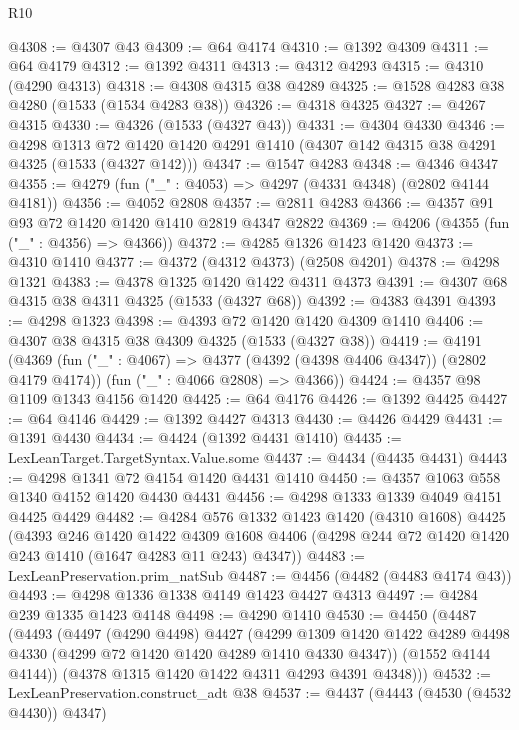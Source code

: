 \begin{lexlean}{R10}
\begin{coremodule}
@4308 := @4307 @43
@4309 := @64 @4174
@4310 := @1392 @4309
@4311 := @64 @4179
@4312 := @1392 @4311
@4313 := @4312 @4293
@4315 := @4310 (@4290 @4313)
@4318 := @4308 @4315 @38 @4289
@4325 := @1528 @4283 @38 @4280 (@1533 (@1534 @4283 @38))
@4326 := @4318 @4325
@4327 := @4267 @4315
@4330 := @4326 (@1533 (@4327 @43))
@4331 := @4304 @4330
@4346 := @4298
    @1313
    @72
    @1420
    @1420
    @4291
    @1410
    (@4307 @142 @4315 @38 @4291 @4325 (@1533 (@4327 @142)))
@4347 := @1547 @4283
@4348 := @4346 @4347
@4355 := @4279 (fun ("_" : @4053) => @4297 (@4331 @4348) (@2802 @4144 @4181))
@4356 := @4052 @2808
@4357 := @2811 @4283
@4366 := @4357 @91 @93 @72 @1420 @1420 @1410 @2819 @4347 @2822
@4369 := @4206 (@4355 (fun ("_" : @4356) => @4366))
@4372 := @4285 @1326 @1423 @1420
@4373 := @4310 @1410
@4377 := @4372 (@4312 @4373) (@2508 @4201)
@4378 := @4298 @1321
@4383 := @4378 @1325 @1420 @1422 @4311 @4373
@4391 := @4307 @68 @4315 @38 @4311 @4325 (@1533 (@4327 @68))
@4392 := @4383 @4391
@4393 := @4298 @1323
@4398 := @4393 @72 @1420 @1420 @4309 @1410
@4406 := @4307 @38 @4315 @38 @4309 @4325 (@1533 (@4327 @38))
@4419 := @4191
    (@4369
      (fun ("_" : @4067) => @4377 (@4392 (@4398 @4406 @4347)) (@2802 @4179 @4174))
      (fun ("_" : @4066 @2808) => @4366))
@4424 := @4357 @98 @1109 @1343 @4156 @1420
@4425 := @64 @4176
@4426 := @1392 @4425
@4427 := @64 @4146
@4429 := @1392 @4427 @4313
@4430 := @4426 @4429
@4431 := @1391 @4430
@4434 := @4424 (@1392 @4431 @1410)
@4435 := LexLeanTarget.TargetSyntax.Value.some
@4437 := @4434 (@4435 @4431)
@4443 := @4298 @1341 @72 @4154 @1420 @4431 @1410
@4450 := @4357 @1063 @558 @1340 @4152 @1420 @4430 @4431
@4456 := @4298 @1333 @1339 @4049 @4151 @4425 @4429
@4482 := @4284
    @576
    @1332
    @1423
    @1420
    (@4310 @1608)
    @4425
    (@4393
      @246
      @1420
      @1422
      @4309
      @1608
      @4406
      (@4298 @244 @72 @1420 @1420 @243 @1410 (@1647 @4283 @11 @243) @4347))
@4483 := LexLeanPreservation.prim_natSub
@4487 := @4456 (@4482 (@4483 @4174 @43))
@4493 := @4298 @1336 @1338 @4149 @1423 @4427 @4313
@4497 := @4284 @239 @1335 @1423 @4148
@4498 := @4290 @1410
@4530 := @4450
    (@4487
      (@4493
        (@4497
          (@4290 @4498)
          @4427
          (@4299
            @1309
            @1420
            @1422
            @4289
            @4498
            @4330
            (@4299 @72 @1420 @1420 @4289 @1410 @4330 @4347))
          (@1552 @4144 @4144))
        (@4378 @1315 @1420 @1422 @4311 @4293 @4391 @4348)))
@4532 := LexLeanPreservation.construct_adt @38
@4537 := @4437 (@4443 (@4530 (@4532 @4430)) @4347)

\end{coremodule}
\end{lexlean}
